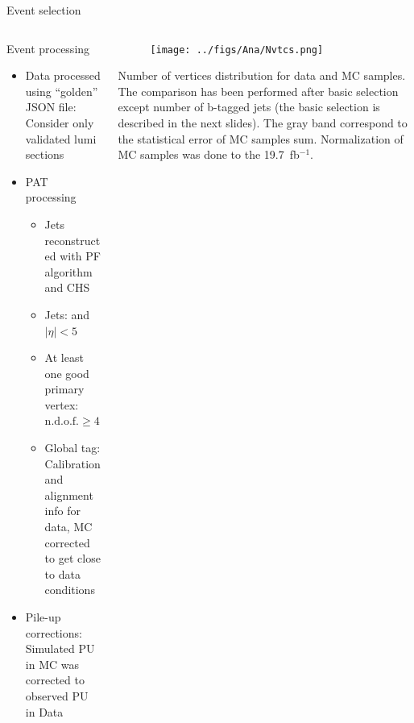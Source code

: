 \begin{frame}{Event selection}
\vspace{-.2cm}

\begin{columns}

\begin{column}{.55\textwidth}
\begin{block}{Event processing}
\begin{itemize}\scriptsize
  \item Data processed using ``golden'' JSON file: Consider only validated lumi sections
  \item PAT processing
    \begin{itemize}\tiny
    \item Jets reconstructed with PF algorithm and CHS
    \item Jets:  and $|\eta|<5$
    \item At least one good primary vertex: $\text{n.d.o.f.} \ge 4,\; |z|<24 \;\text{cm},\; |\rho|< 2 \;\text{cm}$
    \item Global tag: Calibration and alignment info for data, MC corrected to get close to data conditions
    \end{itemize}
  \item Pile-up corrections: Simulated PU in MC was corrected to observed PU in Data
\end{itemize}
\end{block}
\end{column}

\begin{column}{.45\textwidth}
\vspace{-.9cm}
\begin{figure}[!Hhtbp]
  \begin{center}
    \texttt{[image: ../figs/Ana/Nvtcs.png]}
  \end{center}
\end{figure}
\vspace{-.75cm}
\begin{block}{}
\tiny Number of vertices distribution for data and MC samples. The comparison has been performed after basic selection except number of b-tagged jets (the basic selection is described in the next slides). The gray band correspond to the statistical error of MC samples sum. Normalization of MC samples was done to the 19.7~fb$^{-1}$.
\end{block}
\end{column}

\end{columns}
\end{frame}

